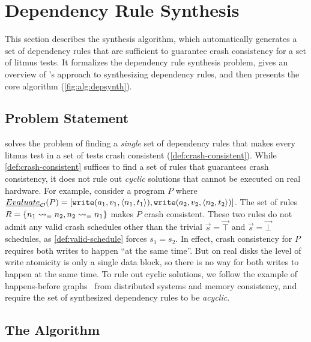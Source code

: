 \section{Dependency Rule Synthesis}\label{sec:alg}

This section describes the \depsynth synthesis algorithm,
which automatically generates a set of dependency rules
that are sufficient to guarantee crash consistency for a set of litmus tests.
It formalizes the dependency rule synthesis problem,
gives an overview of \depsynth's approach to synthesizing dependency rules,
and then presents the core \depsynth algorithm (\cref{fig:alg:depsynth}).

\subsection{Problem Statement}\label{sec:alg:problem}

\depsynth solves the problem of 
finding a \emph{single} set of dependency rules 
that makes every litmus test \test
in a set of tests \tests
crash consistent (\cref{def:crash-consistent}).
%
While \cref{def:crash-consistent} suffices to find a set of rules 
that guarantees crash consistency,
it does not rule out \emph{cyclic} solutions that cannot be executed on real hardware.
For example, consider a program $P$
where $\evaluate{P}{\sys} = [\texttt{write}(a_1, v_1, \langle n_1, t_1 \rangle), \texttt{write}(a_2, v_2, \langle n_2, t_2 \rangle)]$.
The set of rules $R = \{ \deprule{n_1}{n_2}{=}, \deprule{n_2}{n_1}{=} \}$
makes $P$ crash consistent.
These two rules do not admit any valid crash schedules
other than the trivial $\vec{s} = \vec{\top}$ and $\vec{s} = \vec{\bot}$ schedules,
as \cref{def:valid-schedule} forces $s_1 = s_2$.
In effect, crash consistency for $P$
requires both writes to happen ``at the same time''.
But on real disks the level of write atomicity is only a single data block,
so there is no way for both writes to happen at the same time.
To rule out cyclic solutions,
we follow the example of happens-before graphs~\cite{lamport:happens-before}
from distributed systems and memory consistency,
and require the set of synthesized dependency rules  to be \emph{acyclic}.\tighten

\subsection{The \depsynth Algorithm}\label{sec:alg:alg}

